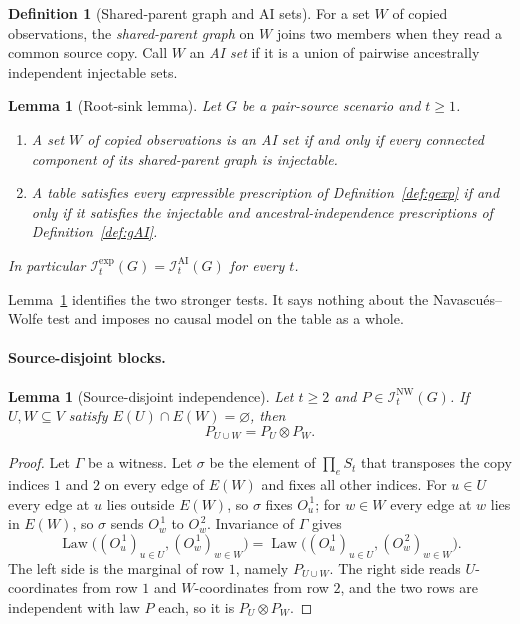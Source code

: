 \documentclass[11pt]{article}
\theoremstyle{plain}
\newtheorem{lemma}[theorem]{Lemma}
\theoremstyle{definition}
\newtheorem{definition}[theorem]{Definition}
\DeclareMathOperator{\Law}{Law}
\newcommand{\INW}{\mathcal I^{\mathrm{NW}}}
\newcommand{\IAI}{\mathcal I^{\mathrm{AI}}}
\newcommand{\Iexp}{\mathcal I^{\mathrm{exp}}}
\begin{document}
\begin{definition}[Shared-parent graph and AI sets]\label{def:sharedparent}
For a set $W$ of copied observations, the \emph{shared-parent graph} on $W$ joins two members when they read a common source copy. Call $W$ an \emph{AI set} if it is a union of pairwise ancestrally independent injectable sets.
\end{definition}

\begin{lemma}[Root-sink lemma]\label{lem:rootsink}
Let $G$ be a pair-source scenario and $t\ge1$.
\begin{enumerate}[label=(\roman*),nosep]
\item A set $W$ of copied observations is an AI set if and only if every connected component of its shared-parent graph is injectable.
\item A table satisfies every expressible prescription of Definition~\ref{def:gexp} if and only if it satisfies the injectable and ancestral-independence prescriptions of Definition~\ref{def:gAI}.
\end{enumerate}
In particular $\Iexp_t(G)=\IAI_t(G)$ for every $t$.
\end{lemma}


Lemma~\ref{lem:rootsink} identifies the two stronger tests. It says nothing about the Navascués--Wolfe test and imposes no causal model on the table as a whole.

\paragraph{Source-disjoint blocks.}

\begin{lemma}[Source-disjoint independence]\label{lem:sourcedisjoint}
Let $t\ge2$ and $P\in\INW_t(G)$. If $U,W\subseteq V$ satisfy $E(U)\cap E(W)=\varnothing$, then
\[
P_{U\cup W}=P_U\otimes P_W.
\]
\end{lemma}

\begin{proof}
Let $\Gamma$ be a witness. Let $\sigma$ be the element of $\prod_eS_t$ that transposes the copy indices $1$ and $2$ on every edge of $E(W)$ and fixes all other indices. For $u\in U$ every edge at $u$ lies outside $E(W)$, so $\sigma$ fixes $O_u^{\,1}$; for $w\in W$ every edge at $w$ lies in $E(W)$, so $\sigma$ sends $O_w^{\,1}$ to $O_w^{\,2}$. Invariance of $\Gamma$ gives
\[
\Law\bigl((O_u^{\,1})_{u\in U},(O_w^{\,1})_{w\in W}\bigr)=\Law\bigl((O_u^{\,1})_{u\in U},(O_w^{\,2})_{w\in W}\bigr).
\]
The left side is the marginal of row $1$, namely $P_{U\cup W}$. The right side reads $U$-coordinates from row $1$ and $W$-coordinates from row $2$, and the two rows are independent with law $P$ each, so it is $P_U\otimes P_W$.
\end{proof}
\end{document}

